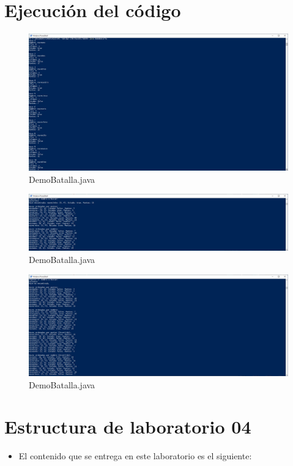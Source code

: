 \documentclass{article}
\newcommand{\itemPracticeNumber}{04}
\begin{document}
\section{Ejecución del código}
\begin{figure}[H]
	\centering
	\includegraphics[width=1\textwidth,keepaspectratio]{img/ejec01.jpg}
	\caption{DemoBatalla.java}
\end{figure}
\begin{figure}[H]
	\centering
	\includegraphics[width=1\textwidth,keepaspectratio]{img/ejec02.jpg}
	\caption{DemoBatalla.java}
\end{figure}
\begin{figure}[H]
	\centering
	\includegraphics[width=1\textwidth,keepaspectratio]{img/ejec03.jpg}
	\caption{DemoBatalla.java}
\end{figure}
\pagebreak

\section{Estructura de laboratorio \itemPracticeNumber}
\begin{itemize}
	\item El contenido que se entrega en este laboratorio es el siguiente:
\end{itemize}
\end{document}
